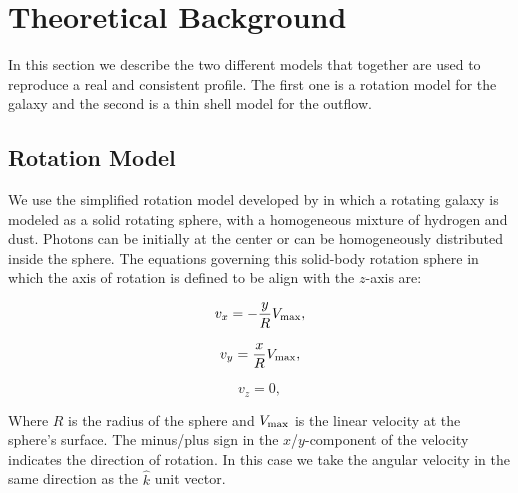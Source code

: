 \documentclass{latex/emulateapj}
\begin{document}


\section{Theoretical Background}
\label{sec:theo}
In this section we describe the two different models that together are
used to reproduce a real and consistent \lya profile. The first one is
a rotation model for the galaxy and the second is a thin shell model
for the outflow. \\ 

\subsection{Rotation Model}

We use the simplified rotation model developed by \citep{Garavito14}
in which a rotating galaxy is modeled as a solid rotating sphere, with
a homogeneous mixture of hydrogen and dust. Photons can be initially
at the center or can be homogeneously distributed inside the
sphere. The equations governing this solid-body rotation sphere in
which the axis of rotation is defined to be align with the $z$-axis
are: 

\begin{equation}
v_{x}=-\frac{y}{R}V_{\rm max}, \label{subeq1}
\end{equation}

\begin{equation}
v_{y}=\frac{x}{R}V_{\rm max}, \label{subeq2}
\end{equation}

\begin{equation}
v_{z}=0, \label{subeq3}
\end{equation}

Where $R$ is the radius of the sphere and $V_{\rm max}$ is the linear
velocity at the sphere's surface. The minus/plus sign in the
$x$/$y$-component of the velocity indicates the direction of
rotation. In this case we take the angular velocity in the same
direction as the $\hat{k}$ unit vector.
\end{document}
